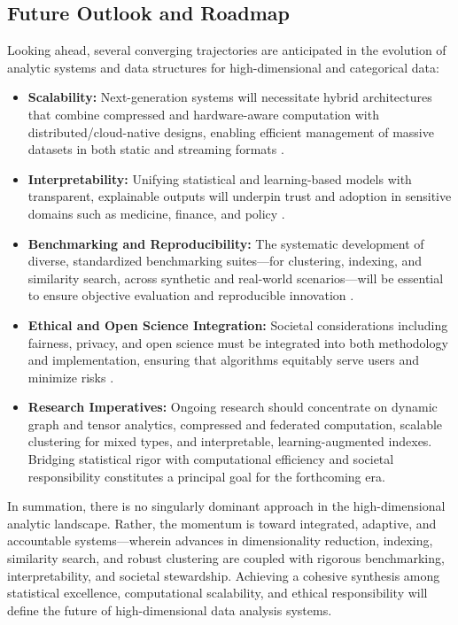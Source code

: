 \documentclass[sigconf]{acmart}
\begin{document}
\subsection{Future Outlook and Roadmap}

Looking ahead, several converging trajectories are anticipated in the evolution of analytic systems and data structures for high-dimensional and categorical data:

\begin{itemize}
    \item \textbf{Scalability:} Next-generation systems will necessitate hybrid architectures that combine compressed and hardware-aware computation with distributed/cloud-native designs, enabling efficient management of massive datasets in both static and streaming formats \cite{ref84,ref87}.
    \item \textbf{Interpretability:} Unifying statistical and learning-based models with transparent, explainable outputs will underpin trust and adoption in sensitive domains such as medicine, finance, and policy \cite{ref110,ref116}.
    \item \textbf{Benchmarking and Reproducibility:} The systematic development of diverse, standardized benchmarking suites—for clustering, indexing, and similarity search, across synthetic and real-world scenarios—will be essential to ensure objective evaluation and reproducible innovation \cite{ref116}.
    \item \textbf{Ethical and Open Science Integration:} Societal considerations including fairness, privacy, and open science must be integrated into both methodology and implementation, ensuring that algorithms equitably serve users and minimize risks \cite{ref117,ref118}.
    \item \textbf{Research Imperatives:} Ongoing research should concentrate on dynamic graph and tensor analytics, compressed and federated computation, scalable clustering for mixed types, and interpretable, learning-augmented indexes. Bridging statistical rigor with computational efficiency and societal responsibility constitutes a principal goal for the forthcoming era.
\end{itemize}

In summation, there is no singularly dominant approach in the high-dimensional analytic landscape. Rather, the momentum is toward integrated, adaptive, and accountable systems—wherein advances in dimensionality reduction, indexing, similarity search, and robust clustering are coupled with rigorous benchmarking, interpretability, and societal stewardship. Achieving a cohesive synthesis among statistical excellence, computational scalability, and ethical responsibility will define the future of high-dimensional data analysis systems.



\end{document}
